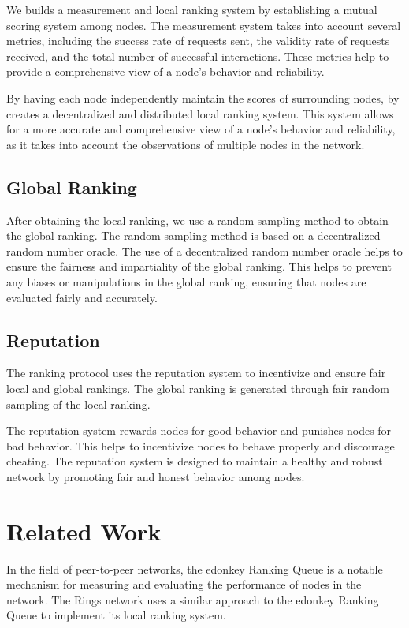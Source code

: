 \documentclass[twocolumn]{article}
\begin{document}
We builds a measurement and local ranking system by establishing a mutual scoring system among nodes. The measurement system takes into account several metrics, including the success rate of requests sent, the validity rate of requests received, and the total number of successful interactions. These metrics help to provide a comprehensive view of a node's behavior and reliability.

By having each node independently maintain the scores of surrounding nodes, by creates a decentralized and distributed local ranking system. This system allows for a more accurate and comprehensive view of a node's behavior and reliability, as it takes into account the observations of multiple nodes in the network.


\subsection{Global Ranking}

After obtaining the local ranking, we use a random sampling method to obtain the global ranking. The random sampling method is based on a decentralized random number oracle. The use of a decentralized random number oracle helps to ensure the fairness and impartiality of the global ranking. This helps to prevent any biases or manipulations in the global ranking, ensuring that nodes are evaluated fairly and accurately.
\subsection{Reputation}

The ranking protocol uses the reputation system to incentivize and ensure fair local and global rankings. The global ranking is generated through fair random sampling of the local ranking.

The reputation system rewards nodes for good behavior and punishes nodes for bad behavior. This helps to incentivize nodes to behave properly and discourage cheating. The reputation system is designed to maintain a healthy and robust network by promoting fair and honest behavior among nodes.

\section{Related Work}
In the field of peer-to-peer networks, the edonkey Ranking Queue is a notable mechanism for measuring and evaluating the performance of nodes in the network. The Rings network uses a similar approach to the edonkey Ranking Queue to implement its local ranking system.
\end{document}
